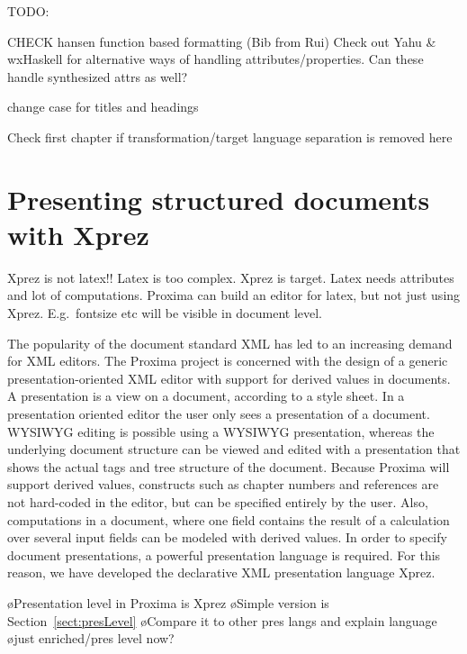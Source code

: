 
\bc
TODO:


CHECK hansen function based formatting (Bib from Rui)
Check out  Yahu & wxHaskell for alternative ways of handling attributes/properties. Can these handle synthesized attrs as well?

change case for titles and headings

Check first chapter if transformation/target language separation is removed here
\ec






\chapter{Presenting structured documents with {\sc Xprez}} \label{chap:presenting}

{\sc Xprez} is not latex!! Latex is too complex. {\sc Xprez} is target. Latex needs attributes and lot of computations. Proxima can build an editor for latex, but not just using {\sc Xprez}. E.g.\ fontsize etc will be visible in document level.


\bc
The popularity of the document standard XML has led to an increasing demand for XML editors. The Proxima project is concerned with the design of a generic presentation-oriented XML editor with support for derived values in documents. A presentation is a view on a document, according to a style sheet. In a presentation oriented editor the user only sees a presentation of a document. WYSIWYG editing is possible using a WYSIWYG presentation, whereas the underlying document structure can be viewed and edited with a presentation that shows the actual tags and tree structure of the document. Because Proxima will support derived values, constructs such as chapter numbers and references are not hard-coded in the editor, but can be specified entirely by the user. Also, computations in a document, where one field contains the result of a calculation over several input fields can be modeled with derived values. In order to specify document presentations, a powerful presentation language is required. For this reason, we have developed the declarative XML presentation language {\sc Xprez}.
\ec


\bl
\o Presentation level in Proxima is Xprez
\o Simple version is Section~\ref{sect:presLevel}
\o Compare it to other pres langs and explain language
\o just enriched/pres level now?
\el

